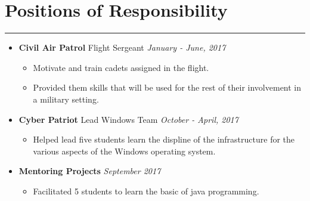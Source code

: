 \documentclass[a4paper]{article}
\begin{document}
\section*{Positions of Responsibility}
\hrule
\vspace{3mm}
\begin{itemize}
	\item
	      \textbf{Civil Air Patrol} Flight Sergeant
	      \hfill \textit{January - June, 2017}
	      \begin{itemize}
	      	\vspace{-2mm} \setlength\itemsep{-0.7mm}
		\item Motivate and train cadets assigned in the flight. 
		\item Provided them skills that will be used for the rest of their involvement in a military setting.
	      \end{itemize}
	\item
	      \textbf{Cyber Patriot} Lead Windows Team
	      \hfill \textit{October - April, 2017}
	      \begin{itemize}
	      	\vspace{-2mm} \setlength\itemsep{-0.7mm}
		\item Helped lead five students learn the displine of the infrastructure for the various aspects of the Windows operating system.
	      \end{itemize}
	\item
	      \textbf{Mentoring Projects}
		  \hfill \textit{September 2017}
	      \begin{itemize}
	      	\vspace{-2mm} \setlength\itemsep{-0.7mm}
	      	\item Facilitated 5 students to learn the basic of java programming.
	      \end{itemize}
\end{itemize}

\end{document}
